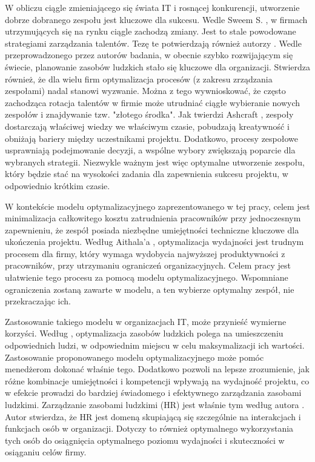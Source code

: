 \par W obliczu ciągle zmieniającego się świata IT i rosnącej konkurencji, utworzenie dobrze dobranego zespołu jest kluczowe dla sukcesu. Wedle Sweem S. \parencite{sweem2009leveraging}, w firmach utrzymujących się na rynku ciągle zachodzą zmiany. Jest to stale powodowane strategiami zarządzania talentów. Tezę te potwierdzają również autorzy \parencite{rusilowati2024optimizing}. Wedle przeprowadzonego przez autorów badania, w obecnie szybko rozwijającym się świecie, planowanie zasobów ludzkich stało się kluczowe dla organizacji. Stwierdza również, że dla wielu firm optymalizacja procesów (z zakresu zrządzania zespołami) nadal stanowi wyzwanie. Można z tego wywnioskować, że często zachodząca rotacja talentów w firmie może utrudniać ciągłe wybieranie nowych zespołów i znajdywanie tzw. "złotego środka". Jak twierdzi Ashcraft \parencite{ashcraft2011ipd}, zespoły dostarczają właściwej wiedzy we właściwym czasie, pobudzają kreatywność i obniżają bariery między uczestnikami projektu. Dodatkowo, procesy zespołowe usprawniają podejmowanie decyzji, a wspólne wybory zwiększają poparcie dla wybranych strategii. Niezwykle ważnym jest więc optymalne utworzenie zespołu, który będzie stać na wysokości zadania dla zapewnienia sukcesu projektu, w odpowiednio krótkim czasie.

\par W kontekście modelu optymalizacyjnego zaprezentowanego w tej pracy, celem jest minimalizacja całkowitego kosztu zatrudnienia pracowników przy jednoczesnym zapewnieniu, że zespół posiada niezbędne umiejętności techniczne kluczowe dla ukończenia projektu. Według Aithala'a \parencite{aithal2016theory}, optymalizacja wydajności jest trudnym procesem dla firmy, który wymaga wydobycia najwyższej produktywności z pracowników, przy utrzymaniu ograniczeń organizacyjnych. Celem pracy jest ułatwienie tego procesu za pomocą modelu optymalizacyjnego. Wspomniane ograniczenia zostaną zawarte w modelu, a ten wybierze optymalny zespół, nie przekraczając ich.

\par Zastosowanie takiego modelu w organizacjach IT, może przynieść wymierne korzyści. Według \parencite{wei2022optimal}, optymalizacja zasobów ludzkich polega na umieszczeniu odpowiednich ludzi, w odpowiednim miejscu w celu maksymalizacji ich wartości. Zastosowanie proponowanego modelu optymalizacyjnego może pomóc menedżerom dokonać właśnie tego. Dodatkowo pozwoli na lepsze zrozumienie, jak różne kombinacje umiejętności i kompetencji wpływają na wydajność projektu, co w efekcie prowadzi do bardziej świadomego i efektywnego zarządzania zasobami ludzkimi. Zarządzanie zasobami ludzkimi (HR) jest właśnie tym według autora \parencite{albi2024innovative}. Autor stwierdza, że HR jest domeną skupiającą się szczególnie na interakcjach i funkcjach osób w organizacji. Dotyczy to również optymalnego wykorzystania tych osób do osiągnięcia optymalnego poziomu wydajności i skuteczności w osiąganiu celów firmy. 


